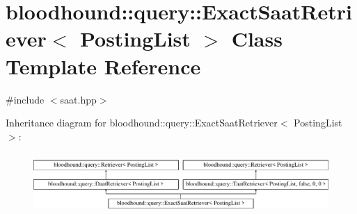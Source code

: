 \hypertarget{classbloodhound_1_1query_1_1ExactSaatRetriever}{}\section{bloodhound\+:\+:query\+:\+:Exact\+Saat\+Retriever$<$ Posting\+List $>$ Class Template Reference}
\label{classbloodhound_1_1query_1_1ExactSaatRetriever}


{\ttfamily \#include $<$saat.\+hpp$>$}

Inheritance diagram for bloodhound\+:\+:query\+:\+:Exact\+Saat\+Retriever$<$ Posting\+List $>$\+:\begin{figure}[H]
\begin{center}
\leavevmode
\includegraphics[height=2.346369cm]{classbloodhound_1_1query_1_1ExactSaatRetriever}
\end{center}
\end{figure}
